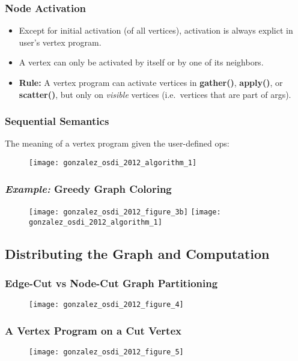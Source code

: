 \begin{frame}
  \frametitle{Node Activation}
  \begin{itemize}
    \item Except for initial activation (of all vertices), activation is always
          explict in user's vertex program.
    \item A vertex can only be activated by itself or by one of its neighbors.
    \item \textbf{Rule:} A vertex program can activate vertices in
          \textbf{gather()}, \textbf{apply()}, or \textbf{scatter()}, but only
          on \textit{visible} vertices (i.e.\ vertices that are part of args).
  \end{itemize}
\end{frame}

\begin{frame}
  \frametitle{Sequential Semantics}
  The meaning of a vertex program given the user-defined ops:
  \begin{figure}
    \centering
    \texttt{[image: gonzalez\_osdi\_2012\_algorithm\_1]}
    \caption{\cite[OSDI '12]{gonzalez2012powergraph}}
  \end{figure}
\end{frame}

\begin{frame}
  \frametitle{\textit{Example:} Greedy Graph Coloring}
  \begin{figure}
    \centering
    \texttt{[image: gonzalez\_osdi\_2012\_figure\_3b]}%
    \texttt{[image: gonzalez\_osdi\_2012\_algorithm\_1]}
    \caption{\cite[OSDI '12]{gonzalez2012powergraph}}
  \end{figure}
\end{frame}


\subsection{Distributing the Graph and Computation}

\begin{frame}
  \frametitle{Edge-Cut vs Node-Cut Graph Partitioning}
  \begin{figure}
    \centering
    \texttt{[image: gonzalez\_osdi\_2012\_figure\_4]}
    \caption{\cite[OSDI '12]{gonzalez2012powergraph}}
  \end{figure}
\end{frame}

\begin{frame}
  \frametitle{A Vertex Program on a Cut Vertex}
  \begin{figure}
    \centering
    \texttt{[image: gonzalez\_osdi\_2012\_figure\_5]}
    \caption{\cite[OSDI '12]{gonzalez2012powergraph}}
  \end{figure}
\end{frame}

